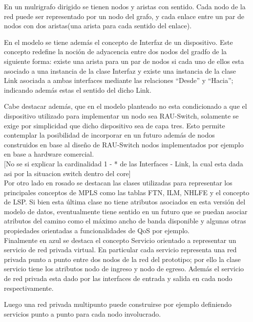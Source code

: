 En un mulrigrafo dirigido se tienen nodos y aristas con sentido. Cada nodo de la red puede ser representado por un nodo del grafo, y cada enlace entre un par de nodos con dos aristas(una arista para cada sentido del enlace).

En el modelo se tiene adem\'as el concepto de Interfaz de un dispositivo. Este concepto redefine la noción de adyacencia entre dos nodos del gradfo de la siguiente forma: existe una arista para un par de nodos si cada uno de ellos esta asociado a una instancia de la clase Interfaz y existe una instancia de la clase Link asociada a ambas interfaces mediante las relaciones “Desde” y “Hacia”; indicando adem\'as estas el sentido del dicho Link.

Cabe destacar adem\'as, que en el modelo planteado no esta condicionado a que el dispositivo utilizado para implementar un nodo sea RAU-Switch, solamente se exige por simplicidad que dicho dispositivo sea  de capa tres. Esto permite contemplar la posibilidad de incorporar en un futuro adem\'as de nodos construidos en base al diseño de RAU-Switch nodos implementados por ejemplo en base a hardware comercial.\\
  
[No se si explicar la cardinalidad 1 - * de las Interfaces - Link, la cual esta dada asi por la situacion switch dentro del core]\\

Por otro lado en rosado se destacan las clases utilizadas para representar los principales conceptos de MPLS como las tablas FTN, ILM, NHLFE y el concepto de LSP. Si bien esta \'ultima clase no tiene atributos asociados en esta versi\'on del modelo de datos, eventualmente tiene sentido en un futuro que se puedan asociar atributos del camino como el m\'aximo ancho de banda disponible y algunas otras propiedades orientadas a funcionalidades de QoS por ejemplo.\\

Finalmente en azul se destaca el concepto Servicio orientado a representar un servicio de red privada virtual. En particular cada servicio representa una red privada punto a punto entre dos nodos de la red del prototipo; por ello la clase servicio tiene los atributos nodo de ingreso y nodo de egreso. Adem\'as el servicio de red privada esta dado por las interfaces de entrada y salida en cada nodo respectivamente.

Luego una red privada multipunto puede construirse por ejemplo definiendo servicios punto a punto para cada nodo involucrado.

